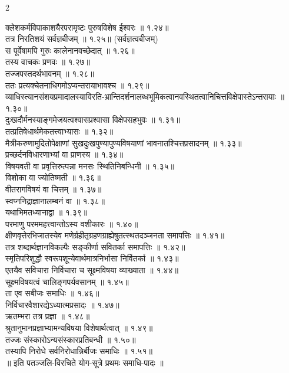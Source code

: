 \documentclass[9pt,a4paper,landscape]{article}
\begin{document}
\begin{multicols}{2}
\begin{flushleft}
क्लेशकर्मविपाकाशयैरपरामृष्टः पुरुषविशेष ईश्वरः ॥ १.२४॥\\
तत्र निरतिशयं सर्वज्ञबीजम् ॥ १.२५॥ (सर्वज्ञत्वबीजम्) \\
स पूर्वेषामपि गुरुः कालेनानवच्छेदात् ॥ १.२६॥\\
तस्य वाचकः प्रणवः ॥ १.२७॥\\
तज्जपस्तदर्थभावनम् ॥ १.२८॥\\
ततः प्रत्यक्चेतनाधिगमोऽप्यन्तरायाभावश्च ॥ १.२९॥\\
व्याधिस्त्यानसंशयप्रमादालस्याविरति-भ्रान्तिदर्शनालब्धभूमिकत्वानवस्थितत्वानिचित्तविक्षेपास्तेऽन्तरायाः ॥ १.३०॥\\
दुःखदौर्मनस्याङ्गमेजयत्वश्वासप्रश्वासा विक्षेपसहभुवः ॥ १.३१॥\\
तत्प्रतिषेधार्थमेकतत्त्वाभ्यासः ॥ १.३२॥\\
मैत्रीकरुणामुदितोपेक्षाणां सुखदुःखपुण्यापुण्यविषयाणां भावनातश्चित्तप्रसादनम् ॥ १.३३॥\\
प्रच्छर्दनविधारणाभ्यां वा प्राणस्य ॥ १.३४॥\\
विषयवती वा प्रवृत्तिरुत्पन्ना मनसः स्थितिनिबन्धिनी ॥ १.३५॥\\
विशोका वा ज्योतिष्मती ॥ १.३६॥\\
वीतरागविषयं वा चित्तम् ॥ १.३७॥\\
स्वप्ननिद्राज्ञानालम्बनं वा ॥ १.३८॥\\
यथाभिमतध्यानाद्वा ॥ १.३९॥\\
परमाणु परममहत्त्वान्तोऽस्य वशीकारः ॥ १.४०॥\\
क्षीणवृत्तेरभिजातस्येव मणेर्ग्रहीतृग्रहणग्राह्येषुतत्स्थतदञ्जनता समापत्तिः ॥ १.४१॥\\
तत्र शब्दार्थज्ञानविकल्पैः सङ्कीर्णा सवितर्का समापत्तिः ॥ १.४२॥\\
स्मृतिपरिशुद्धौ स्वरूपशून्येवार्थमात्रनिर्भासा निर्वितर्का ॥ १.४३॥\\
एतयैव सविचारा निर्विचारा च सूक्ष्मविषया व्याख्याता ॥ १.४४॥\\
सूक्ष्मविषयत्वं चालिङ्गपर्यवसानम् ॥ १.४५॥\\
ता एव सबीजः समाधिः ॥ १.४६॥\\
निर्विचारवैशारद्येऽध्यात्मप्रसादः ॥ १.४७॥\\
ऋतम्भरा तत्र प्रज्ञा ॥ १.४८॥\\
श्रुतानुमानप्रज्ञाभ्यामन्यविषया विशेषार्थत्वात् ॥ १.४९॥\\
तज्जः संस्कारोऽन्यसंस्कारप्रतिबन्धी ॥ १.५०॥\\
तस्यापि निरोधे सर्वनिरोधान्निर्बीजः समाधिः ॥ १.५१॥\\
॥ इति पतञ्जलि-विरचिते योग-सूत्रे प्रथमः समाधि-पादः ॥\\
\end{flushleft}


\end{multicols}
\end{document}
